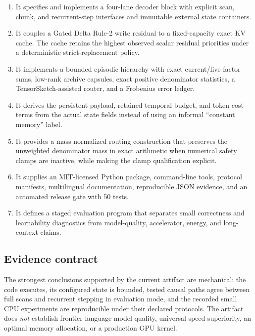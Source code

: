 \begin{enumerate}
  \item It specifies and implements a four-lane decoder block with explicit
  scan, chunk, and recurrent-step interfaces and immutable external state
  containers.

  \item It couples a Gated Delta Rule-2 write residual to a fixed-capacity
  exact KV cache. The cache retains the highest observed scalar residual
  priorities under a deterministic strict-replacement policy.

  \item It implements a bounded episodic hierarchy with exact current/live
  factor sums, low-rank archive capsules, exact positive denominator
  statistics, a TensorSketch-assisted router, and a Frobenius error ledger.

  \item It derives the persistent payload, retained temporal budget, and
  token-cost terms from the actual state fields instead of using an informal
  ``constant memory'' label.

  \item It provides a mass-normalized routing construction that preserves the
  unweighted denominator mass in exact arithmetic when numerical safety
  clamps are inactive, while making the clamp qualification explicit.

  \item It supplies an MIT-licensed Python package, command-line tools,
  protocol manifests, multilingual documentation, reproducible JSON evidence,
  and an automated release gate with 50 tests.

  \item It defines a staged evaluation program that separates small
  correctness and learnability diagnostics from model-quality, accelerator,
  energy, and long-context claims.
\end{enumerate}

\subsection{Evidence contract}
\label{sec:evidence-contract-intro}

The strongest conclusions supported by the current artifact are mechanical:
the code executes, its configured state is bounded, tested causal paths agree
between full scans and recurrent stepping in evaluation mode, and the recorded
small CPU experiments are reproducible under their declared protocols. The
artifact does \emph{not} establish frontier language-model quality, universal
speed superiority, an optimal memory allocation, or a production GPU kernel.

